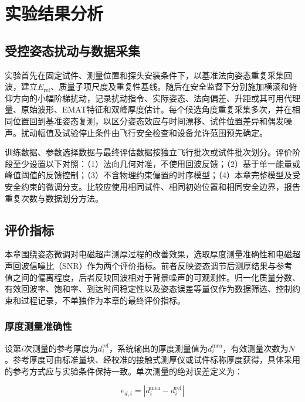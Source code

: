 \section{实验结果分析}

\subsection{受控姿态扰动与数据采集}

实验首先在固定试件、测量位置和探头安装条件下，以基准法向姿态重复采集回波，建立$E_{\mathrm{ref}}$、质量子项尺度及重复性基线。随后在安全监督下分别施加横滚和俯仰方向的小幅阶梯扰动，记录扰动指令、实际姿态、法向偏差、升距或其可用代理量、原始波形、EMAT特征和双峰厚度估计。每个候选角度重复采集多次，并在相同位置回到基准姿态复测，以区分姿态效应与时间漂移、试件位置差异和偶发噪声。扰动幅值及试验停止条件由飞行安全检查和设备允许范围预先确定。

训练数据、参数选择数据与最终评估数据按独立飞行批次或试件批次划分。评价阶段至少设置以下对照：（1）法向几何对准，不使用回波反馈；（2）基于单一能量或峰值阈值的反馈控制；（3）不含物理约束偏置的时序模型；（4）本章完整模型及受安全约束的微调分支。比较应使用相同试件、相同初始位置和相同安全边界，报告重复次数与数据划分方法。

\subsection{评价指标}

本章围绕姿态微调对电磁超声测厚过程的改善效果，选取厚度测量准确性和电磁超声回波信噪比（SNR）作为两个评价指标。前者反映姿态调节后测厚结果与参考值之间的偏离程度，后者反映回波相对于背景噪声的可观测性。归一化质量分数、有效回波率、饱和率、到达时间稳定性以及姿态误差等量仅作为数据筛选、控制约束和过程记录，不单独作为本章的最终评价指标。

\subsubsection{厚度测量准确性}

设第$i$次测量的参考厚度为$d_i^{\mathrm{ref}}$，系统输出的厚度测量值为$d_i^{\mathrm{mea}}$，有效测量次数为$N$。参考厚度可由标准量块、经校准的接触式测厚仪或试件标称厚度获得，具体采用的参考方式应与实验条件保持一致。单次测量的绝对误差定义为：

\begin{equation}
e_{d,i}=\left|d_i^{\mathrm{mea}}-d_i^{\mathrm{ref}}\right|
\label{eq:thickness_abs_error}
\end{equation}

